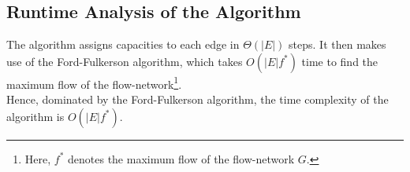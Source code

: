 \documentclass[12pt]{report}
\begin{document}
    \subsection*{Runtime Analysis of the Algorithm}
    The algorithm assigns capacities to each edge in $\Theta(|E|)$ steps.
    It then makes use of the Ford-Fulkerson algorithm, which takes $O(|E| f^{*})$ time to find the maximum flow of the flow-network\footnote{
        Here, $f^{*}$ denotes the maximum flow of the flow-network $G$.
    }.
    \vspace*{10pt} \\
    Hence, dominated by the Ford-Fulkerson algorithm, the time complexity of the algorithm is $O(|E| f^{*})$.
\end{document}
